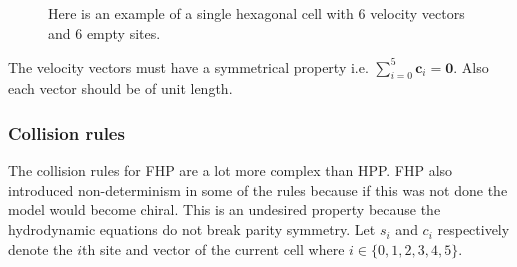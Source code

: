 \documentclass[a4paper,10pt]{article}
\begin{document}
\begin{figure}[H]
  \caption{Here is an example of a single hexagonal cell with 6 velocity vectors and 6 empty sites.}
  \label{figure:Hsingle-cell}
\end{figure}
\noindent The velocity vectors must have a symmetrical property i.e. $\sum_{i = 0}^{5} \textbf{c}_{i} = \textbf{0}$. Also each vector should be of unit length.
\subsubsection{Collision rules}
The collision rules for FHP are a lot more complex than HPP. FHP also introduced non-determinism in some of the rules because if this was not done the model would become chiral. This is an undesired property because the hydrodynamic equations do not break parity symmetry.
Let $s_{i}$ and $c_{i}$ respectively denote the $i$th site and vector of the current cell where $i \in \{0, 1, 2, 3, 4, 5\}$. 
\end{document}
